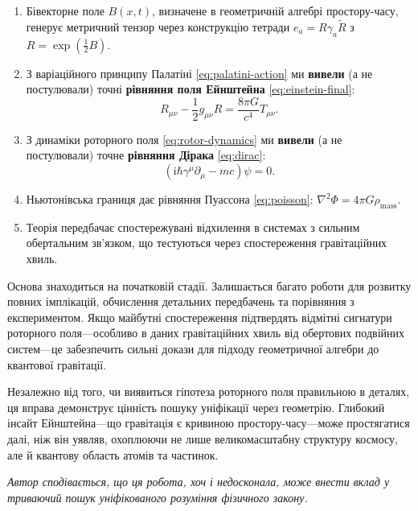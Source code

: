 \documentclass[11pt,a4paper]{article}
\numberwithin{equation}{section}
\theoremstyle{plain}
\theoremstyle{definition}
\theoremstyle{remark}
\newcommand{\ii}{\mathrm{i}}
\newif\ifack
\begin{document}
\begin{enumerate}
  \item Бівекторне поле $B(x,t)$, визначене в геометричній алгебрі простору-часу, генерує метричний тензор через конструкцію тетради $e_a = R\gamma_a\widetilde{R}$ з $R = \exp(\frac{1}{2}B)$.
  \item З варіаційного принципу Палатіні \eqref{eq:palatini-action} ми \textbf{вивели} (а не постулювали) точні \textbf{рівняння поля Ейнштейна} \eqref{eq:einstein-final}:
  \begin{equation*}
  R_{\mu\nu} - \frac{1}{2}g_{\mu\nu}R = \frac{8\pi G}{c^4} T_{\mu\nu}.
  \end{equation*}
  \item З динаміки роторного поля \eqref{eq:rotor-dynamics} ми \textbf{вивели} (а не постулювали) точне \textbf{рівняння Дірака} \eqref{eq:dirac}:
  \begin{equation*}
  (\ii\hbar\gamma^\mu \partial_\mu - mc)\psi = 0.
  \end{equation*}
  \item Ньютонівська границя дає рівняння Пуассона \eqref{eq:poisson}: $\nabla^2\Phi = 4\pi G\rho_{\mathrm{mass}}$.
  \item Теорія передбачає спостережувані відхилення в системах з сильним обертальним зв'язком, що тестуються через спостереження гравітаційних хвиль.
\end{enumerate}

Основа знаходиться на початковій стадії. Залишається багато роботи для розвитку повних імплікацій, обчислення детальних передбачень та порівняння з експериментом. Якщо майбутні спостереження підтвердять відмітні сигнатури роторного поля---особливо в даних гравітаційних хвиль від обертових подвійних систем---це забезпечить сильні докази для підходу геометричної алгебри до квантової гравітації.

Незалежно від того, чи виявиться гіпотеза роторного поля правильною в деталях, ця вправа демонструє цінність пошуку уніфікації через геометрію. Глибокий інсайт Ейнштейна---що гравітація є кривиною простору-часу---може простягатися далі, ніж він уявляв, охоплюючи не лише великомасштабну структуру космосу, але й квантову область атомів та частинок.

\medskip
\noindent\textit{Автор сподівається, що ця робота, хоч і недосконала, може внести вклад у триваючий пошук уніфікованого розуміння фізичного закону.}

\ifack
\section*{Подяки}
Автор вдячний піонерській роботі Девіда Хестенса та колег у розробці геометричної алгебри як мови для фізики. Подяка належить колабораціям LIGO та Virgo за надання даних гравітаційних хвиль у публічний доступ. Ця робота проводилась незалежно без зовнішнього фінансування.
\fi
\end{document}
